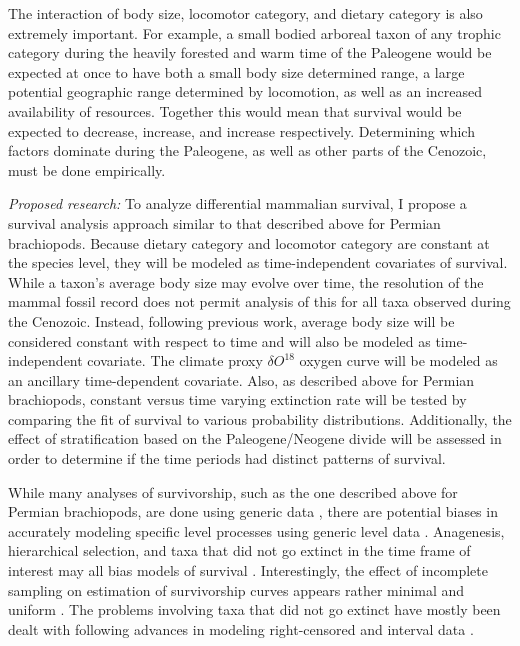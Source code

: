 \documentclass[12pt,letterpaper]{article}
\begin{document}
The interaction of body size, locomotor category, and dietary category is also extremely important. For example, a small bodied arboreal taxon of any trophic category during the heavily forested and warm time of the Paleogene would be expected at once to have both a small body size determined range, a large potential geographic range determined by locomotion, as well as an increased availability of resources. Together this would mean that survival would be expected to decrease, increase, and increase respectively. Determining which factors dominate during the Paleogene, as well as other parts of the Cenozoic, must be done empirically.


\textit{Proposed research:}
To analyze differential mammalian survival, I propose a survival analysis approach similar to that described above for Permian brachiopods. Because dietary category and locomotor category are constant at the species level, they will be modeled as time-independent covariates of survival. While a taxon's average body size may evolve over time, the resolution of the mammal fossil record does not permit analysis of this for all taxa observed during the Cenozoic. Instead, following previous work, average body size will be considered constant with respect to time and will also be modeled as time-independent covariate. The climate proxy \(\delta O^{18}\) oxygen curve \citep{Zachos2008} will be modeled as an ancillary time-dependent covariate. Also, as described above for Permian brachiopods, constant versus time varying extinction rate will be tested by comparing the fit of survival to various probability distributions. Additionally, the effect of stratification based on the Paleogene/Neogene divide will be assessed in order to determine if the time periods had distinct patterns of survival.

While many analyses of survivorship, such as the one described above for Permian brachiopods, are done using generic data \citep{Tomiya2013,Liow2008,Harnik2013}, there are potential biases in accurately modeling specific level processes using generic level data \citep{Raup1975,Sepkoski1975,Simpson2006,Raup1991a,VanValen1979}. Anagenesis, hierarchical selection, and taxa that did not go extinct in the time frame of interest may all bias models of survival \citep{Raup1975,VanValen1979,Simpson2006,Raup1991a}. Interestingly, the effect of incomplete sampling on estimation of survivorship curves appears rather minimal and uniform \citep{Sepkoski1975}. The problems involving taxa that did not go extinct have mostly been dealt with following advances in modeling right-censored and interval data \citep{Kleinbaum2005}.
\end{document}
